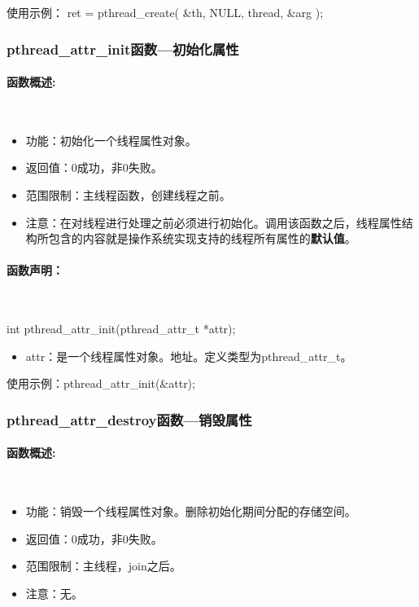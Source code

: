 \documentclass[UTF8]{article}%
\begin{document}
使用示例： ret = pthread\_create( \&th, NULL, thread, \&arg );  

\subsubsection{pthread\_attr\_init函数---初始化属性}

\paragraph{函数概述:}~{}

\begin{itemize}
    \item 功能：初始化一个线程属性对象。
    \item 返回值：0成功，非0失败。
    \item 范围限制：主线程函数，创建线程之前。
    \item 注意：在对线程进行处理之前必须进行初始化。调用该函数之后，线程属性结构所包含的内容就是操作系统实现支持的线程所有属性的\textbf{默认值}。
\end{itemize}

\paragraph{函数声明：}~{}

int pthread\_attr\_init(pthread\_attr\_t *attr);

\begin{itemize}
    \item attr：是一个线程属性对象。地址。定义类型为pthread\_attr\_t。
\end{itemize}

使用示例：pthread\_attr\_init(\&attr);

\subsubsection{pthread\_attr\_destroy函数---销毁属性}

\paragraph{函数概述:}~{}

\begin{itemize}
    \item 功能：销毁一个线程属性对象。删除初始化期间分配的存储空间。
    \item 返回值：0成功，非0失败。
    \item 范围限制：主线程，join之后。
    \item 注意：无。
\end{itemize}
\end{document}
